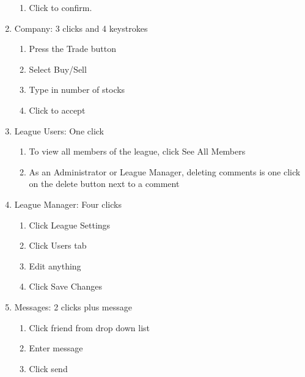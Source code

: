 \begin{enumerate}
\begin{enumerate}
\item Click to confirm.
\end{enumerate}
\item Company: 3 clicks and 4 keystrokes
\begin{enumerate}
\item Press the Trade button
\item Select Buy/Sell 
\item Type in number of stocks 
\item Click to accept
\end{enumerate}
\item League Users: One click
\begin{enumerate}
\item To view all members of the league, click See All Members
\item As an Administrator or League Manager, deleting comments is one click on the delete button next to a comment
\end{enumerate}
\item League Manager: Four clicks
\begin{enumerate}
\item Click League Settings
\item Click Users tab
\item Edit anything
\item Click Save Changes
\end{enumerate}

\item Messages: 2 clicks plus message
\begin{enumerate}
\item Click friend from drop down list
\item Enter message
\item Click send
\end{enumerate}
\end{enumerate}